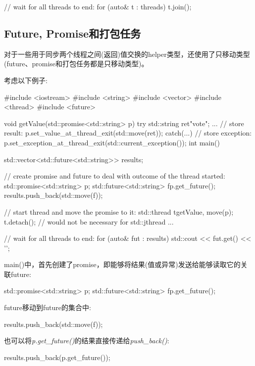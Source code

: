\begin{cppcode}
// wait for all threads to end:
for (auto& t : threads) {
	t.join();
}
\end{cppcode}

\subsection{Future, Promise和打包任务}

对于一些用于同步两个线程之间(返回)值交换的helper类型，还使用了只移动类型(future、promise和打包任务都是只移动类型)。

考虑以下例子:

\begin{cppcode}
#include <iostream>
#include <string>
#include <vector>
#include <thread>
#include <future>

void getValue(std::promise<std::string> p)
{
	try {
		std::string ret{"vote"};
		...
		// store result:
		p.set_value_at_thread_exit(std::move(ret));
	}
	catch(...) {
		// store exception:
		p.set_exception_at_thread_exit(std::current_exception());
	}
}
int main()
{
	std::vector<std::future<std::string>> results;
	
	// create promise and future to deal with outcome of the thread started:
	std::promise<std::string> p;
	std::future<std::string> f{p.get_future()};
	results.push_back(std::move(f));
	
	// start thread and move the promise to it:
	std::thread t{getValue, move(p)};
	t.detach(); // would not be necessary for std::jthread
	...
	
	// wait for all threads to end:
	for (auto& fut : results) {
		std::cout << fut.get() << '\n';
	}
}
\end{cppcode}

main()中，首先创建了promise，即能够将结果(值或异常)发送给能够读取它的关联future:

\begin{cppcode}
std::promise<std::string> p;
std::future<std::string> f{p.get_future()};
\end{cppcode}

future移动到future的集合中:

\begin{cppcode}
results.push_back(std::move(f));
\end{cppcode}

也可以将\textit{p.get_future()}的结果直接传递给\textit{push_back()}:

\begin{cppcode}
results.push_back(p.get_future());
\end{cppcode}

